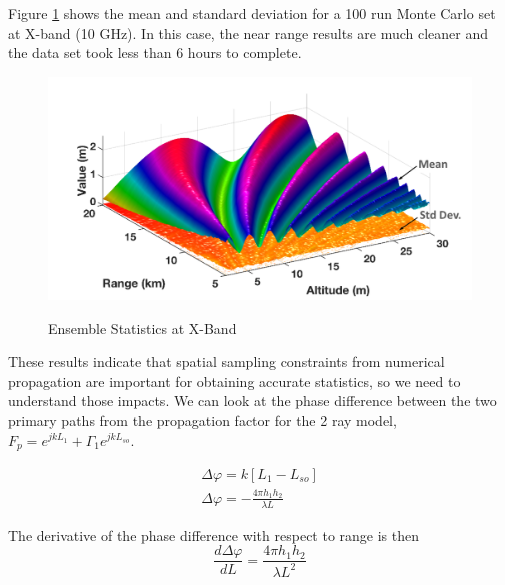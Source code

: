 Figure \ref{stat_fig:2} shows the mean and standard deviation for a 100 run Monte Carlo set at X-band (10 GHz). In this case, the near range results are much cleaner and the data set took less than 6 hours to complete.
\begin{figure}[H]
  \begin{center}
\includegraphics[width=5in]{../media/statistics/x_band_stats.png}
  \end{center}
  \renewcommand{\baselinestretch}{1} \small\normalsize
  \begin{quote}
    \caption[Ensemble Statistics at X-Band]{Ensemble Statistics at X-Band\label{stat_fig:2}}
  \end{quote}
\end{figure}
\renewcommand{\baselinestretch}{2} \small\normalsize

These results indicate that spatial sampling constraints from numerical propagation are important for obtaining accurate statistics, so we need to understand those impacts. We can look at the phase difference between the two primary paths from the propagation factor for the 2 ray model, $F_p = e^{jkL_1} + \Gamma_1e^{jkL_{so}}$. 

\begin{equation}
\begin{gathered}
\Delta\varphi = k\left[ L_1 - L_{so}\right] \\
\Delta\varphi = -\frac{4\pi h_1h_2}{\lambda L}
\label{stat_eq:1}
\end{gathered}
\end{equation}
\renewcommand{\baselinestretch}{2} \small\normalsize

\noindent The derivative of the phase difference with respect to range is then
\begin{equation}
\frac{d\Delta\varphi}{dL}=\frac{4\pi h_1h_2}{\lambda L^2}
\label{stat_eq:2}
\end{equation}
\renewcommand{\baselinestretch}{2} \small\normalsize

